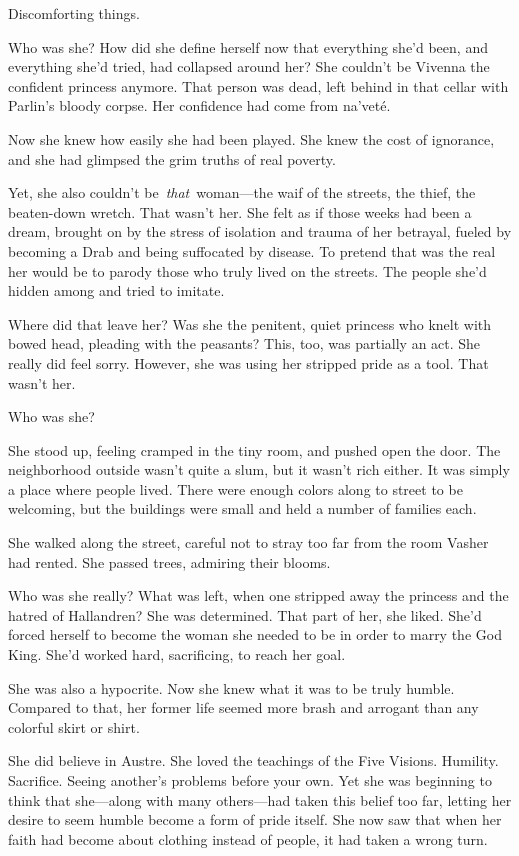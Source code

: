 Discomforting things.

Who was she? How did she define herself now that everything she’d been, and everything she’d tried, had collapsed around her? She couldn’t be Vivenna the confident princess anymore. That person was dead, left behind in that cellar with Parlin’s bloody corpse. Her confidence had come from na’veté.

Now she knew how easily she had been played. She knew the cost of ignorance, and she had glimpsed the grim truths of real poverty.

Yet, she also couldn’t be~\textit{that}~woman—the waif of the streets, the thief, the beaten-down wretch. That wasn’t her. She felt as if those weeks had been a dream, brought on by the stress of isolation and trauma of her betrayal, fueled by becoming a Drab and being suffocated by disease. To pretend that was the real her would be to parody those who truly lived on the streets. The people she’d hidden among and tried to imitate.

Where did that leave her? Was she the penitent, quiet princess who knelt with bowed head, pleading with the peasants? This, too, was partially an act. She really did feel sorry. However, she was using her stripped pride as a tool. That wasn’t her.

Who was she?

She stood up, feeling cramped in the tiny room, and pushed open the door. The neighborhood outside wasn’t quite a slum, but it wasn’t rich either. It was simply a place where people lived. There were enough colors along to street to be welcoming, but the buildings were small and held a number of families each.

She walked along the street, careful not to stray too far from the room Vasher had rented. She passed trees, admiring their blooms.

Who was she really? What was left, when one stripped away the princess and the hatred of Hallandren? She was determined. That part of her, she liked. She’d forced herself to become the woman she needed to be in order to marry the God King. She’d worked hard, sacrificing, to reach her goal.

She was also a hypocrite. Now she knew what it was to be truly humble. Compared to that, her former life seemed more brash and arrogant than any colorful skirt or shirt.

She did believe in Austre. She loved the teachings of the Five Visions. Humility. Sacrifice. Seeing another’s problems before your own. Yet she was beginning to think that she—along with many others—had taken this belief too far, letting her desire to seem humble become a form of pride itself. She now saw that when her faith had become about clothing instead of people, it had taken a wrong turn.

